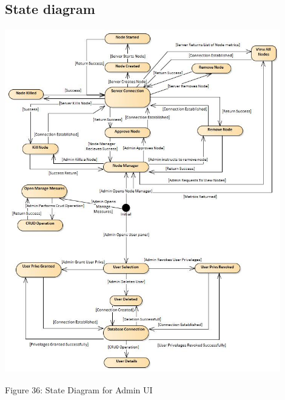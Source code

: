 \subsection{State diagram}
    \includegraphics[width=12cm,height=15cm,keepaspectratio]{admin_ui/images/State_Diagram.jpg}
		\begin{center}
	    \small{Figure 36: State Diagram for Admin UI}
    \end{center}




